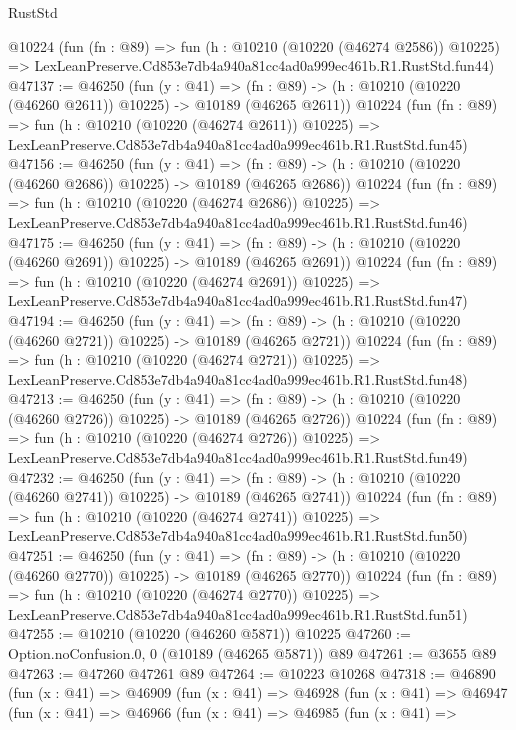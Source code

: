 \begin{lexlean}{RustStd}
\begin{coremodule}
    @10224
    (fun (fn : @89) =>
    fun (h : @10210 (@10220 (@46274 @2586)) @10225) =>
    LexLeanPreserve.Cd853e7db4a940a81cc4ad0a999ec461b.R1.RustStd.fun44)
@47137 := @46250
    (fun (y : @41) =>
    (fn : @89) -> (h : @10210 (@10220 (@46260 @2611)) @10225) -> @10189 (@46265 @2611))
    @10224
    (fun (fn : @89) =>
    fun (h : @10210 (@10220 (@46274 @2611)) @10225) =>
    LexLeanPreserve.Cd853e7db4a940a81cc4ad0a999ec461b.R1.RustStd.fun45)
@47156 := @46250
    (fun (y : @41) =>
    (fn : @89) -> (h : @10210 (@10220 (@46260 @2686)) @10225) -> @10189 (@46265 @2686))
    @10224
    (fun (fn : @89) =>
    fun (h : @10210 (@10220 (@46274 @2686)) @10225) =>
    LexLeanPreserve.Cd853e7db4a940a81cc4ad0a999ec461b.R1.RustStd.fun46)
@47175 := @46250
    (fun (y : @41) =>
    (fn : @89) -> (h : @10210 (@10220 (@46260 @2691)) @10225) -> @10189 (@46265 @2691))
    @10224
    (fun (fn : @89) =>
    fun (h : @10210 (@10220 (@46274 @2691)) @10225) =>
    LexLeanPreserve.Cd853e7db4a940a81cc4ad0a999ec461b.R1.RustStd.fun47)
@47194 := @46250
    (fun (y : @41) =>
    (fn : @89) -> (h : @10210 (@10220 (@46260 @2721)) @10225) -> @10189 (@46265 @2721))
    @10224
    (fun (fn : @89) =>
    fun (h : @10210 (@10220 (@46274 @2721)) @10225) =>
    LexLeanPreserve.Cd853e7db4a940a81cc4ad0a999ec461b.R1.RustStd.fun48)
@47213 := @46250
    (fun (y : @41) =>
    (fn : @89) -> (h : @10210 (@10220 (@46260 @2726)) @10225) -> @10189 (@46265 @2726))
    @10224
    (fun (fn : @89) =>
    fun (h : @10210 (@10220 (@46274 @2726)) @10225) =>
    LexLeanPreserve.Cd853e7db4a940a81cc4ad0a999ec461b.R1.RustStd.fun49)
@47232 := @46250
    (fun (y : @41) =>
    (fn : @89) -> (h : @10210 (@10220 (@46260 @2741)) @10225) -> @10189 (@46265 @2741))
    @10224
    (fun (fn : @89) =>
    fun (h : @10210 (@10220 (@46274 @2741)) @10225) =>
    LexLeanPreserve.Cd853e7db4a940a81cc4ad0a999ec461b.R1.RustStd.fun50)
@47251 := @46250
    (fun (y : @41) =>
    (fn : @89) -> (h : @10210 (@10220 (@46260 @2770)) @10225) -> @10189 (@46265 @2770))
    @10224
    (fun (fn : @89) =>
    fun (h : @10210 (@10220 (@46274 @2770)) @10225) =>
    LexLeanPreserve.Cd853e7db4a940a81cc4ad0a999ec461b.R1.RustStd.fun51)
@47255 := @10210 (@10220 (@46260 @5871)) @10225
@47260 := Option.noConfusion.{0, 0} (@10189 (@46265 @5871)) @89
@47261 := @3655 @89
@47263 := @47260 @47261 @89
@47264 := @10223 @10268
@47318 := @46890
    (fun (x : @41) =>
    @46909
      (fun (x : @41) =>
      @46928
        (fun (x : @41) =>
        @46947
          (fun (x : @41) =>
          @46966
            (fun (x : @41) =>
            @46985
              (fun (x : @41) =>

\end{coremodule}
\end{lexlean}
